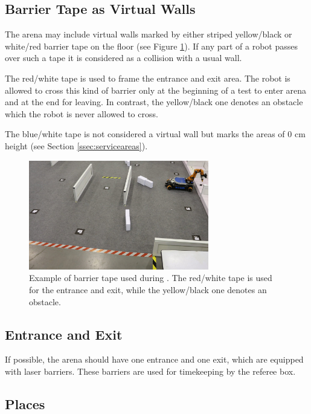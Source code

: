 \subsection{Barrier Tape as Virtual Walls} \label{ssec:barrier_tape}
The arena may include virtual walls marked by either striped yellow/black or white/red barrier tape on the floor (see Figure \ref{fig:barrier_tape}). If any part of a robot passes over such a tape it is considered as a collision with a usual wall.

The red/white tape is used to frame the entrance and exit area. The robot is allowed to cross this kind of barrier only at the beginning of a test to enter arena and at the end for leaving. In contrast, the yellow/black one denotes an obstacle which the robot is never allowed to cross.

The blue/white tape is not considered a virtual wall but marks the areas of 0 cm height (see Section \ref{ssec:serviceareas}).

\begin{figure} [h!]
\centering
\includegraphics[width= 0.7\textwidth ]{./images/barrier_tapes_in_china15.jpg}
\caption{Example of barrier tape used during . The red/white tape is used for the entrance and exit, while the yellow/black one denotes an obstacle.}
\label{fig:barrier_tape}
\end{figure}



\subsection{Entrance and Exit}
If possible, the arena should have one entrance and one exit, which are equipped with laser barriers. These barriers are used for timekeeping by the referee box.



\subsection{Places}


